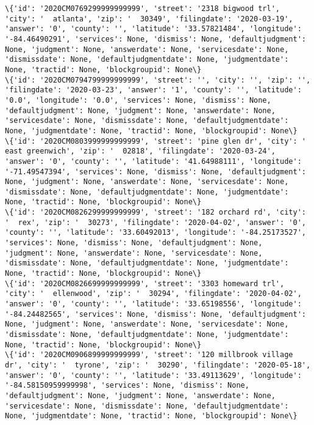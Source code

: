 \documentclass[11pt]{article}
\begin{document}
\begin{Verbatim}[commandchars=\\\{\}]
\{'id': '2020CM0769299999999999', 'street': '2318 bigwood trl', 'city': '  atlanta', 'zip': '  30349', 'filingdate': '2020-03-19', 'answer': '0', 'county': '', 'latitude': '33.57821484', 'longitude': '-84.46490291', 'services': None, 'dismiss': None, 'defaultjudgment': None, 'judgment': None, 'answerdate': None, 'servicesdate': None, 'dismissdate': None, 'defaultjudgmentdate': None, 'judgmentdate': None, 'tractid': None, 'blockgroupid': None\}
\{'id': '2020CM0794799999999999', 'street': '', 'city': '', 'zip': '', 'filingdate': '2020-03-23', 'answer': '1', 'county': '', 'latitude': '0.0', 'longitude': '0.0', 'services': None, 'dismiss': None, 'defaultjudgment': None, 'judgment': None, 'answerdate': None, 'servicesdate': None, 'dismissdate': None, 'defaultjudgmentdate': None, 'judgmentdate': None, 'tractid': None, 'blockgroupid': None\}
\{'id': '2020CM0803999999999999', 'street': 'pine glen dr', 'city': '  east greenwich', 'zip': '  02818', 'filingdate': '2020-03-24', 'answer': '0', 'county': '', 'latitude': '41.64988111', 'longitude': '-71.49547394', 'services': None, 'dismiss': None, 'defaultjudgment': None, 'judgment': None, 'answerdate': None, 'servicesdate': None, 'dismissdate': None, 'defaultjudgmentdate': None, 'judgmentdate': None, 'tractid': None, 'blockgroupid': None\}
\{'id': '2020CM0826299999999999', 'street': '182 orchard rd', 'city': '  rex', 'zip': '  30273', 'filingdate': '2020-04-02', 'answer': '0', 'county': '', 'latitude': '33.60492013', 'longitude': '-84.25173527', 'services': None, 'dismiss': None, 'defaultjudgment': None, 'judgment': None, 'answerdate': None, 'servicesdate': None, 'dismissdate': None, 'defaultjudgmentdate': None, 'judgmentdate': None, 'tractid': None, 'blockgroupid': None\}
\{'id': '2020CM0826699999999999', 'street': '3303 homeward trl', 'city': '  ellenwood', 'zip': '  30294', 'filingdate': '2020-04-02', 'answer': '0', 'county': '', 'latitude': '33.65198556', 'longitude': '-84.24482565', 'services': None, 'dismiss': None, 'defaultjudgment': None, 'judgment': None, 'answerdate': None, 'servicesdate': None, 'dismissdate': None, 'defaultjudgmentdate': None, 'judgmentdate': None, 'tractid': None, 'blockgroupid': None\}
\{'id': '2020CM0906899999999999', 'street': '120 millbrook village dr', 'city': '  tyrone', 'zip': '  30290', 'filingdate': '2020-05-18', 'answer': '0', 'county': '', 'latitude': '33.49113629', 'longitude': '-84.58150959999998', 'services': None, 'dismiss': None, 'defaultjudgment': None, 'judgment': None, 'answerdate': None, 'servicesdate': None, 'dismissdate': None, 'defaultjudgmentdate': None, 'judgmentdate': None, 'tractid': None, 'blockgroupid': None\}

\end{Verbatim}
\end{document}
